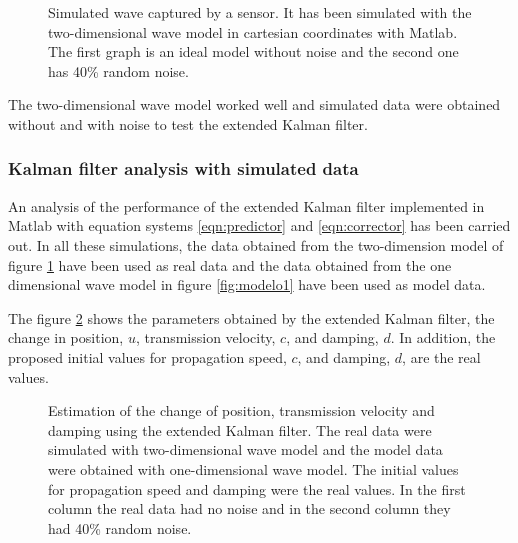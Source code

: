 \documentclass[12pt, a4paper]{article} %
\begin{document}
	\setlength{\parskip}{4mm}
	
	\begin{figure}[h!]
		\centering
		
		\caption{Simulated wave captured by a sensor. It has been simulated with the two-dimensional wave model in cartesian coordinates with Matlab. The first graph is an ideal model without noise and the second one has 40\% random noise.}
		\label{fig:modelo2}
	\end{figure}
	The two-dimensional wave model worked well and simulated data were obtained without and with noise to test the extended Kalman filter.
	
	\setlength{\parskip}{0mm}
	
	\subsubsection{Kalman filter analysis with simulated data}
	
	An analysis of the performance of the extended Kalman filter implemented in Matlab with equation systems \ref{eqn:predictor} and \ref{eqn:corrector} has been carried out. In all these simulations, the data obtained from the two-dimension model of figure \ref{fig:modelo2} have been used as real data and the data obtained from the one dimensional wave model in figure \ref{fig:modelo1} have been used as model data.
	
	\setlength{\parskip}{4mm}
	
	The figure \ref{fig:kalman1} shows the parameters obtained by the extended Kalman filter, the change in position, $u$, transmission velocity, $c$, and damping, $d$. In addition, the proposed initial values for propagation speed, $c$, and damping, $d$, are the real values.
	
	\begin{figure}[h!]
		\centering
		
		\caption{Estimation of the change of position, transmission velocity and damping using the extended Kalman filter. The real data were simulated with two-dimensional wave model and the model data were obtained with one-dimensional wave model. The initial values for propagation speed and damping were the real values. In the first column the real data had no noise and in the second column they had 40\% random noise.}
		\label{fig:kalman1}
	\end{figure}
	
\end{document}
